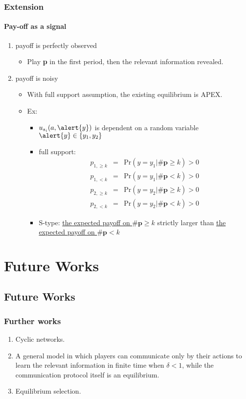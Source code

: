 \documentclass[9pt]{beamer}
\begin{document}
\begin{frame}
\frametitle{Extension}
\framesubtitle{Pay-off as a signal}
\begin{enumerate}

\item payoff is perfectly observed
\begin{itemize}
\item Play \textbf{p} in the first period, then the relevant information revealed.

\end{itemize}
\item payoff is noisy
\begin{itemize}
\item With full support assumption, the existing equilibrium is APEX.
\item Ex: 
\begin{itemize}
\item $u_{s_i}(a, \alert{y})$ is dependent on a random variable $\alert{y}\in \{y_1,y_2\}$
\item full support:
\begin{eqnarray*}
p_{1,\geq k} &=& \mathrm {Pr}(y=y_1|\#\textbf{p}\geq k)>0 \\
p_{1,<k} &=& \mathrm {Pr}(y=y_1|\#\textbf{p}< k)>0 \\
p_{2,\geq k} &=& \mathrm {Pr}(y=y_2|\#\textbf{p}\geq k)>0 \\
p_{2,<k} &=& \mathrm {Pr}(y=y_2|\#\textbf{p}< k)>0 
\end{eqnarray*}
\item S-type: \underline{the expected payoff on $\#\textbf{p}\geq k$} strictly larger than \underline{the expected payoff on $\#\textbf{p}< k$}
\end{itemize}




\end{itemize}


\end{enumerate}


\end{frame}


\section{Future Works}
\subsection{Future Works}


\begin{frame}

\frametitle{Further works}


\begin{enumerate}
\item Cyclic networks.
\item A general model in which players can communicate only by their actions to learn the relevant information in finite time when $\delta<1$, while the communication protocol itself is an equilibrium.
\item Equilibrium selection.  

\end{enumerate}
\end{frame}
\end{document}
